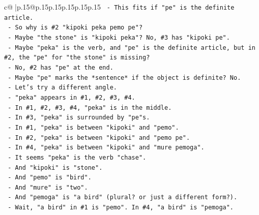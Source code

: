 \documentclass{article}
\begin{document}
{\begin{supertabular}{c@{$\;$}|p{.15\linewidth}@{}p{.15\linewidth}p{.15\linewidth}p{.15\linewidth}p{.15\linewidth}p{.15\linewidth}}
{{{\texttt{                                      {-} This fits if "pe" is the definite article.} \\
\texttt{                                      {-} So why is \#2 "kipoki peka pemo pe"?} \\
\texttt{                                      {-} Maybe "the stone" is "kipoki peka"? No, \#3 has "kipoki pe".} \\
\texttt{                                      {-} Maybe "peka" is the verb, and "pe" is the definite article, but in \#2, the "pe" for "the stone" is missing?} \\
\texttt{                                      {-} No, \#2 has "pe" at the end.} \\
\texttt{                                      {-} Maybe "pe" marks the *sentence* if the object is definite? No.} \\
\texttt{                                      {-} Let's try a different angle.} \\
\texttt{                                      {-} "peka" appears in \#1, \#2, \#3, \#4.} \\
\texttt{                                      {-} In \#1, \#2, \#3, \#4, "peka" is in the middle.} \\
\texttt{                                      {-} In \#3, "peka" is surrounded by "pe"s.} \\
\texttt{                                      {-} In \#1, "peka" is between "kipoki" and "pemo".} \\
\texttt{                                      {-} In \#2, "peka" is between "kipoki" and "pemo pe".} \\
\texttt{                                      {-} In \#4, "peka" is between "kipoki" and "mure pemoga".} \\
\texttt{                                      {-} It seems "peka" is the verb "chase".} \\
\texttt{                                      {-} And "kipoki" is "stone".} \\
\texttt{                                      {-} And "pemo" is "bird".} \\
\texttt{                                      {-} And "mure" is "two".} \\
\texttt{                                      {-} And "pemoga" is "a bird" (plural? or just a different form?).} \\
\texttt{                                      {-} Wait, "a bird" in \#1 is "pemo". In \#4, "a bird" is "pemoga".} \\
}}}
\end{supertabular}}
\end{document}
